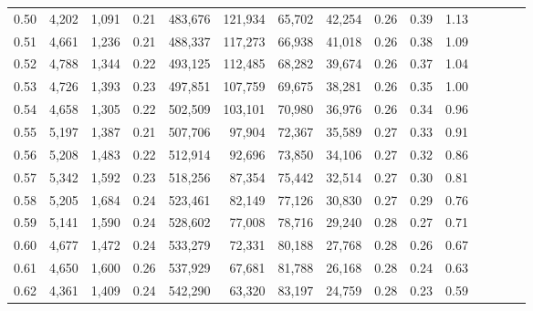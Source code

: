 \begin{tabular}{rrrcrrrrrrrrrrr}
0.50 &   4,202 &  1,091 &                                       0.21 &  483,676 &  121,934 &   65,702 &   42,254 &  0.26 &  0.39 &                         1.13 \\
0.51 &   4,661 &  1,236 &                                       0.21 &  488,337 &  117,273 &   66,938 &   41,018 &  0.26 &  0.38 &                         1.09 \\
0.52 &   4,788 &  1,344 &                                       0.22 &  493,125 &  112,485 &   68,282 &   39,674 &  0.26 &  0.37 &                         1.04 \\
0.53 &   4,726 &  1,393 &                                       0.23 &  497,851 &  107,759 &   69,675 &   38,281 &  0.26 &  0.35 &                         1.00 \\
0.54 &   4,658 &  1,305 &                                       0.22 &  502,509 &  103,101 &   70,980 &   36,976 &  0.26 &  0.34 &                         0.96 \\
0.55 &   5,197 &  1,387 &                                       0.21 &  507,706 &   97,904 &   72,367 &   35,589 &  0.27 &  0.33 &                         0.91 \\
0.56 &   5,208 &  1,483 &                                       0.22 &  512,914 &   92,696 &   73,850 &   34,106 &  0.27 &  0.32 &                         0.86 \\
0.57 &   5,342 &  1,592 &                                       0.23 &  518,256 &   87,354 &   75,442 &   32,514 &  0.27 &  0.30 &                         0.81 \\
0.58 &   5,205 &  1,684 &                                       0.24 &  523,461 &   82,149 &   77,126 &   30,830 &  0.27 &  0.29 &                         0.76 \\
0.59 &   5,141 &  1,590 &                                       0.24 &  528,602 &   77,008 &   78,716 &   29,240 &  0.28 &  0.27 &                         0.71 \\
0.60 &   4,677 &  1,472 &                                       0.24 &  533,279 &   72,331 &   80,188 &   27,768 &  0.28 &  0.26 &                         0.67 \\
0.61 &   4,650 &  1,600 &                                       0.26 &  537,929 &   67,681 &   81,788 &   26,168 &  0.28 &  0.24 &                         0.63 \\
0.62 &   4,361 &  1,409 &                                       0.24 &  542,290 &   63,320 &   83,197 &   24,759 &  0.28 &  0.23 &                         0.59 \\

\end{tabular}
